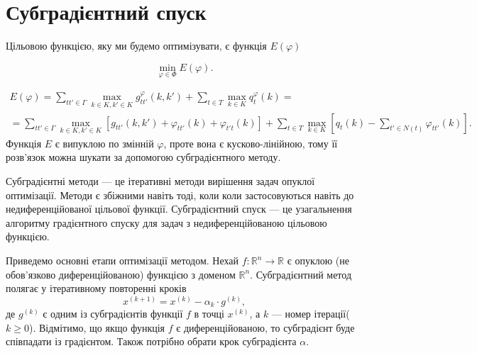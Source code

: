 \section{Субградієнтний спуск}

Цільовою функцією, яку ми будемо оптимізувати, є функція $E(\varphi)$

\begin{equation*}
    \min_{\varphi \in \Phi} E(\varphi).
\end{equation*}

    \begin{multline*}
    E(\varphi) = \sum\limits_{tt'\in\Gamma}\max\limits_{k\in K, k'\in K}g^{\varphi}_{tt'}(k,k') + 
    \sum\limits_{t\in T}\max\limits_{k\in K}q^{\varphi}_t(k) = \\
    =\sum\limits_{tt'\in\Gamma}\max\limits_{k\in K, k'\in K}[ g_{tt'}(k,k')
    + \varphi_{tt'}(k) + \varphi_{t't}(k)]
    +\sum\limits_{t\in T}\max\limits_{k\in K}\left[ q_t(k) - \sum\limits_{t'\in N(t)} \varphi_{tt'}(k)\right].
  \end{multline*}
Функція $E$ є випуклою по змінній $\varphi$, проте вона є кусково-лінійною,
тому її розв'язок можна шукати за допомогою субградієнтного методу.

Субградієнтні методи \cite{Shor1985, savchynskyy,lopatka_stop_cond} --- це ітеративні методи вирішення задач опуклої оптимізації. 
Методи є збіжними навіть тоді, коли коли застосовуються навіть до недиференційованої цільової функції.
Субградієнтний спуск --- це узагальнення алгоритму градієнтного спуску \cite{chong2013introduction} для задач з недиференційованою 
цільовою функцією.

Приведемо основні етапи оптимізації методом. 
Нехай $f:\mathbb{R}^{n}\rightarrow\mathbb{R}$ є опуклою (не обов'язково диференційованою)
функцією з доменом $\mathbb{R}^{n}$.
Субградієнтний метод полягає у ітеративному повторенні кроків
\begin{equation*}
    x^{(k+1)}=x^{(k)}-\alpha_k\cdot g^{(k)},
\end{equation*}
де $g^{(k)}$ є одним із субградієнтів функції $f$ в точці $x^{(k)}$, а $k$ --- номер ітерації($k\geq0$).
Відмітимо, що якщо функція $f$ є диференційованою, то субградієнт буде співпадати із градієнтом.
Також потрібно обрати крок субградієнта $\alpha$.

